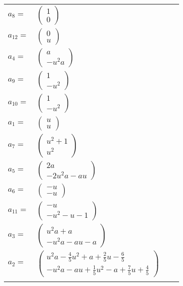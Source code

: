 \documentclass[1p]{elsarticle_modified}
\theoremstyle{definition}
\begin{document}
\begin{tabular}{m{7pt} m{180pt} m{7pt} m{180pt} }
\flushright $a_{8}=$&$\begin{pmatrix}1\\0\end{pmatrix}$ \\
\flushright $a_{12}=$&$\begin{pmatrix}0\\u\end{pmatrix}$ \\
\flushright $a_{4}=$&$\begin{pmatrix}a\\- u^2 a\end{pmatrix}$ \\
\flushright $a_{9}=$&$\begin{pmatrix}1\\- u^2\end{pmatrix}$ \\
\flushright $a_{10}=$&$\begin{pmatrix}1\\- u^2\end{pmatrix}$ \\
\flushright $a_{1}=$&$\begin{pmatrix}u\\u\end{pmatrix}$ \\
\flushright $a_{7}=$&$\begin{pmatrix}u^2+1\\u^2\end{pmatrix}$ \\
\flushright $a_{5}=$&$\begin{pmatrix}2 a\\-2 u^2 a- a u\end{pmatrix}$ \\
\flushright $a_{6}=$&$\begin{pmatrix}- u\\- u\end{pmatrix}$ \\
\flushright $a_{11}=$&$\begin{pmatrix}- u\\- u^2- u-1\end{pmatrix}$ \\
\flushright $a_{3}=$&$\begin{pmatrix}u^2 a+a\\- u^2 a- a u- a\end{pmatrix}$ \\
\flushright $a_{2}=$&$\begin{pmatrix}u^2 a-\frac{4}{5} u^2+a+\frac{2}{5} u-\frac{6}{5}\\- u^2 a- a u+\frac{1}{5} u^2- a+\frac{7}{5} u+\frac{4}{5}\end{pmatrix}$\\&\end{tabular}
\end{document}
